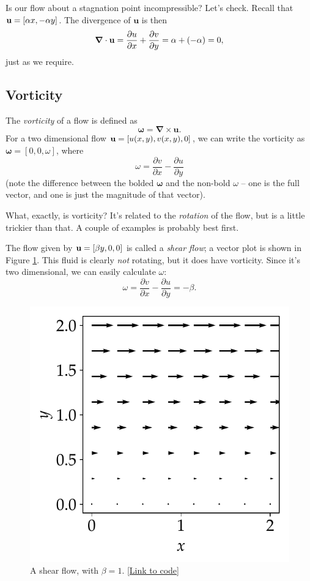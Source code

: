 \begin{example}
Is our flow about a stagnation point incompressible?  Let's check.  Recall that $\mathbf{u} = [\alpha x, -\alpha y]$.  The divergence of $\mathbf{u}$ is then
\[
\boldsymbol{\nabla} \cdot \mathbf{u} = \frac{\partial u}{\partial x} + \frac{\partial v}{\partial y} = \alpha + (-\alpha) = 0,
\]
just as we require.
\end{example}


\subsection{Vorticity}

The \emph{vorticity} of a flow is defined as
\begin{equation}
\boldsymbol{\omega} = \boldsymbol{\nabla} \times \mathbf{u}.
\end{equation}
For a two dimensional flow $\mathbf{u} = [u(x, y), v(x, y), 0]$, we can write the vorticity as $\boldsymbol{\omega} = [0,0,\omega]$, where
\[
\omega = \frac{\partial v}{\partial x} - \frac{\partial u}{\partial y}
\]
(note the difference between the bolded $\boldsymbol{\omega}$ and the non-bold $\omega$ -- one is the full vector, and one is just the magnitude of that vector).

What, exactly, is vorticity?  It's related to the \emph{rotation} of the flow, but is a little trickier than that.  A couple of examples is probably best first.

\begin{example}
The flow given by $\mathbf{u} = [\beta y, 0, 0]$ is called a \emph{shear flow}; a vector plot is shown in Figure \ref{fig_shear}.  This fluid is clearly \emph{not} rotating, but it does have vorticity.  Since it's two dimensional, we can easily calculate $\omega$:
\[
\omega = \frac{\partial v}{\partial x} - \frac{\partial u}{\partial y} = -\beta.
\]
\end{example}

\begin{figure}
\centering
\includegraphics[width=0.5\linewidth]{Figures/Chapter1/fig_shear_vector}
\caption{A shear flow, with $\beta = 1$.  \href{https://nbviewer.jupyter.org/github/josephmacmillan/IntroFluidDynamics/blob/master/Jupyter/1-Introduction.ipynb\#Figure-1.6:-A-shear-flow}{[Link to code]}}
\label{fig_shear}
\end{figure}

